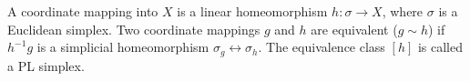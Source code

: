 A coordinate mapping into $X$ is a linear homeomorphism $h: \sigma \rightarrow X$, where $\sigma$ is a Euclidean simplex. Two coordinate mappings $g$ and $h$ are equivalent ($g \sim h$) if $h^{-1}g$ is a simplicial homeomorphism $\sigma_g \leftrightarrow \sigma_h$. The equivalence class $[h]$ is called a PL simplex.
